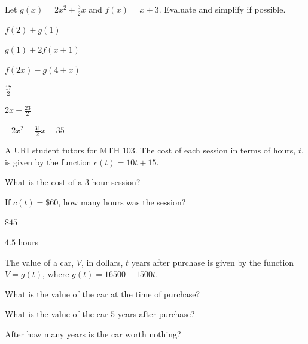 \begin{exercise}
Let $g(x)=2x^2+\frac{3}{2}x$ and $f(x)=x+3$. Evaluate and simplify if possible.


\begin{parts}
\item  $f(2)+g(1)$
\item  $g(1)+2f(x+1)$
\item  $f(2x)-g(4+x)$
\end{parts}
\end{exercise}


\begin{solution}

\begin{parts}
\item $\frac{17}{2}$
\item $2x+\frac{23}{2}$
\item $-2x^2-\frac{31}{2}x-35$
\end{parts}
\end{solution}






\begin{exercise}
A URI student tutors for MTH 103. The cost of each session in terms of hours, $t$, is given by the function $c(t)=10t+15$.


\begin{parts}
\item What is the cost of a 3 hour session?
\item If $c(t)=\$60$, how many hours was the session?
\end{parts}
\end{exercise}


\begin{solution}

\begin{parts}
\item $\$45$
\item $4.5$ hours
\end{parts}
\end{solution}









\begin{exercise}
The value of a car, $V$, in dollars, $t$ years after purchase is given by the function $V=g(t)$, where $g(t)=16500-1500t$.


\begin{parts}
\item What is the value of the car at the time of purchase?

\item What is the value of the car $5$ years after purchase?

\item After how many years is the car worth nothing?
\end{parts}
\end{exercise}



